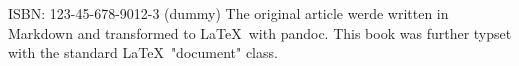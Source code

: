 \mbox{}
\vfill
ISBN: 123-45-678-9012-3 (dummy)
The original article werde written in Markdown
and transformed to \LaTeX\ with pandoc.
This book was further typset with the standard \LaTeX\ "document" class.
\doclicenseThis
